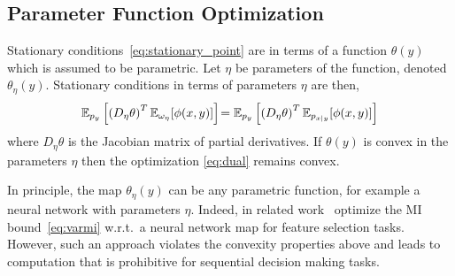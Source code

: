 \subsection{Parameter Function Optimization}

Stationary conditions~\eqref{eq:stationary_point} are in terms of a
function $\theta(y)$ which is assumed to be parametric.  Let $\eta$ be
parameters of the function, denoted $\theta_{\eta}(y)$.  Stationary
conditions in terms of parameters $\eta$ are then,
\begin{equation*}
  \mathbb{E}_{p_y}\left[ \left( D_\eta \theta \right)^T \mathbb{E}_{\omega_\eta}[\phi(x,y)]
    \right]
    \!= \mathbb{E}_{p_y}\left[ \left( D_\eta \theta \right)^T \mathbb{E}_{p_{x\mid
          y}}[ \phi(x,y) ] \right]
\end{equation*}
where $D_\eta \theta$ is the Jacobian matrix of partial derivatives.
If $\theta(y)$ is convex in the parameters $\eta$ then the
optimization \EQN\eqref{eq:dual} remains convex.

In principle, the map $\theta_{\eta}(y)$ can be any parametric
function, for example a neural network with parameters $\eta$.
Indeed, in related work~\cite{chen2018learning} optimize the MI
bound~\eqref{eq:varmi} w.r.t.~a neural network map for feature
selection tasks.  However, such an approach violates the convexity
properties above and leads to computation that is prohibitive for
sequential decision making tasks.


